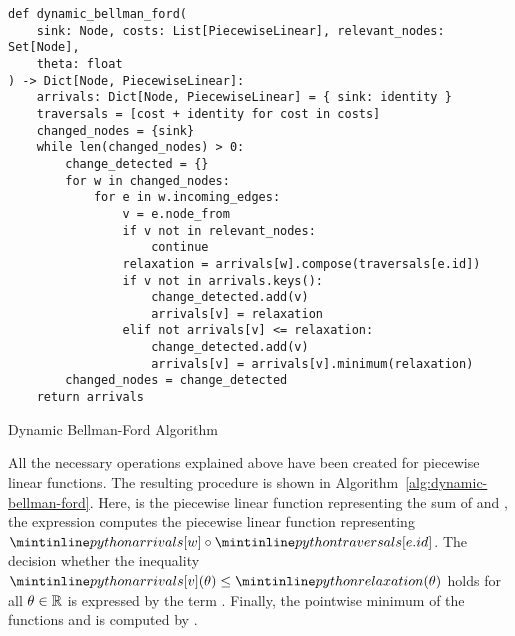 \begin{algorithm}
    \begin{verbatim}
def dynamic_bellman_ford(
    sink: Node, costs: List[PiecewiseLinear], relevant_nodes: Set[Node],
    theta: float
) -> Dict[Node, PiecewiseLinear]:
    arrivals: Dict[Node, PiecewiseLinear] = { sink: identity }
    traversals = [cost + identity for cost in costs]
    changed_nodes = {sink}
    while len(changed_nodes) > 0:
        change_detected = {}
        for w in changed_nodes:
            for e in w.incoming_edges:
                v = e.node_from
                if v not in relevant_nodes:
                    continue
                relaxation = arrivals[w].compose(traversals[e.id])
                if v not in arrivals.keys():
                    change_detected.add(v)
                    arrivals[v] = relaxation
                elif not arrivals[v] <= relaxation:
                    change_detected.add(v)
                    arrivals[v] = arrivals[v].minimum(relaxation)
        changed_nodes = change_detected
    return arrivals
    \end{verbatim}
    \caption{Dynamic Bellman-Ford Algorithm}
    \label{alg:dynamic-bellman-ford}
\end{algorithm}

All the necessary operations explained above have been created for piecewise linear functions.
The resulting procedure is shown in Algorithm~\ref{alg:dynamic-bellman-ford}.
Here,  is the piecewise linear function representing the sum of  and , the expression  computes the piecewise linear function representing $\code{arrivals[w]}\circ \code{traversals[e.id]}$.
The decision whether the inequality $\code{arrivals[v]}(\theta) \leq \code{relaxation}(\theta)$ holds for all $\theta \in \mathbb{R}$ is expressed by the term . 
Finally, the pointwise minimum of the functions  and  is computed by .